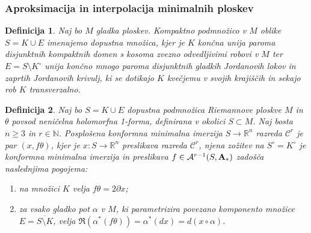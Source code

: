 \documentclass[9pt, table]{beamer}
\newtheorem{definicija}{Definicija}
\newcommand{\R}{\mathbb R}
\newcommand{\N}{\mathbb N}
\begin{document}
\begin{frame}
\frametitle{Aproksimacija in interpolacija minimalnih ploskev}

\begin{definicija}
Naj bo $M$ gladka ploskev. Kompaktno podmnožico v $M$ oblike $S = K \cup E$ imenujemo {\color{blue} dopustna množica}, kjer je $K$ končna unija paroma disjunktnih kompaktnih domen s kosoma zvezno odvedljivimi robovi v $M$ ter $E = S \setminus K^\circ$ unija končno mnogo paroma disjunktnih gladkih Jordanovih lokov in zaprtih Jordanovih krivulj, ki se dotikajo $K$ kvečjemu v svojih krajiščih in sekajo rob $K$ transverzalno.
\end{definicija}
\pause

\begin{definicija}
Naj bo $S = K \cup E$ dopustna podmnožica Riemannove ploskve $M$ in $\theta$ povsod neničelna holomorfna 1-forma, definirana v okolici $S \subset M$.
Naj bosta $n \geq 3$ in $r \in \N$. {\color{blue} Posplošena konformna minimalna imerzija} $S \to \R^{n}$ razreda $\mathcal{C}^{r}$ je par $(x, f \theta)$, kjer je $x \colon S \to \R^{n}$ preslikava razreda  $\mathcal{C}^{r}$, njena zožitev na $S^\circ = K^\circ$ je konformna minimalna imerzija in preslikava $f \in \mathcal{A}^{r-1}(S, \textbf{\textup{A}}_{*})$ zadošča naslednjima pogojema:
\begin{enumerate}
\item na množici $K$ velja $f \theta = 2 \partial x$;
\item za vsako gladko pot $\alpha$ v $M$, ki parametrizira povezano komponento množice $E = \overline{S \setminus K}$, velja $ \Re(\alpha^{*}(f \theta)) = \alpha^{*}(dx) = d(x \circ \alpha)$.
\end{enumerate}
\end{definicija}

\end{frame}

\end{document}
